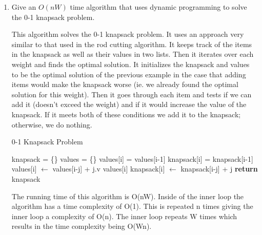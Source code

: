 \documentclass{article}
\begin{document}
\begin{enumerate}
    \item Give an $O(nW)$ time algorithm that uses dynamic programming to solve
        the 0-1 knapsack problem.
        
This algorithm solves the 0-1 knapsack problem. It uses an approach very similar to that used in the rod cutting algorithm. It keeps track of the items in the knapsack as well as their values in two lists. Then it iterates over each weight and finds the optimal solution. It initializes the knapsack and values to be the optimal solution of the previous example in the case that adding items would make the knapsack worse (ie. we already found the optimal solution for this weight). Then it goes through each item and tests if we can add it (doesn't exceed the weight) and if it would increase the value of the knapsack. If it meets both of these conditions we add it to the knapsack; otherwise, we do nothing.
        
\begin{algorithm}
    \caption{0-1 Knapsack Problem}\label{knap}
    \begin{algorithmic}[1]
      \State knapsack = \{\}
      \State values = \{\}
      	\State values[i] = values[i-1]
      	\State knapsack[i] = knapsack[i-1]
      			\State values[i] $\gets$ values[i-j] + j.v values[i]
      			\State knapsack[i] $\gets$ knapsack[i-j] + j
      		\EndIf
      	\EndFor
      \EndFor
      \State \textbf{return} knapsack
    \EndFunction
    \end{algorithmic}
\end{algorithm} 

The running time of this algorithm is O(nW). Inside of the inner loop the algorithm has a time complexity of O(1). This is repeated n times giving the inner loop a complexity of O(n). The inner loop repeats W times which results in the time complexity being O(Wn).


\end{enumerate}
\end{document}
